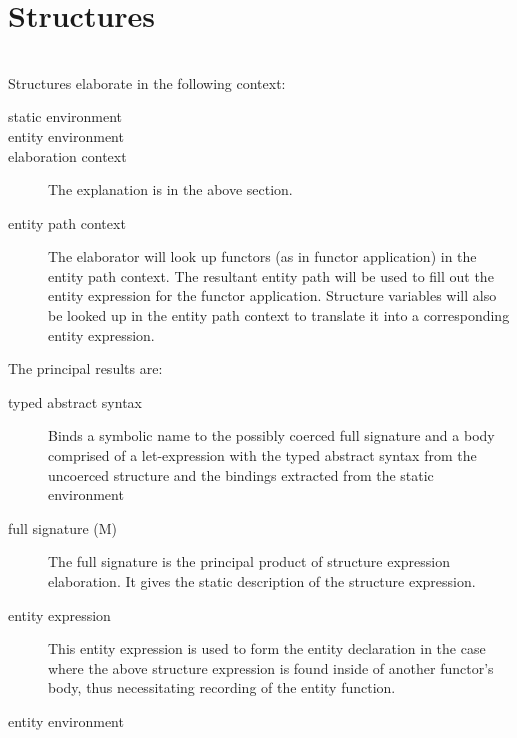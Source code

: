 \section{Structures}%
\\
Structures elaborate in the following context:
\begin{description}
	\item[static environment]
	\item[entity environment]  
	\item[elaboration context] The explanation is in the above section. 
	\item[entity path context] The elaborator will look up functors (as in functor application) in the entity path context. The resultant entity path will be used to fill out the entity expression for the functor application. Structure variables will also be looked up in the entity path context to translate it into a corresponding entity expression. 
\end{description}
The principal results are:
\begin{description}
	\item[typed abstract syntax] Binds a symbolic name to the possibly coerced full signature and a body comprised of a let-expression with the typed abstract syntax from the uncoerced structure and the bindings extracted from the static environment 
	\item[full signature (M)] The full signature is the principal product of structure expression elaboration. It gives the static description of the structure expression. 
	\item[entity expression] This entity expression is used to form the entity declaration in the case where the above structure expression is found inside of another functor's body, thus necessitating recording of the entity function. 
	\item[entity environment]
\end{description}

